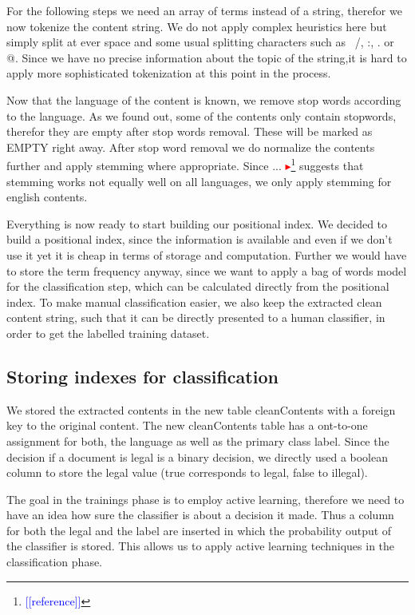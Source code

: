 \documentclass[USenglish,oneside,twocolumn]{article}
\newcommand{\nb}[1]{\textcolor{red}{$\blacktriangleright$}\footnote{\textcolor{blue}{[[#1]]}}}
\begin{document}
For the following steps we need an array of terms instead of a string, therefor we now tokenize the content string. We do not apply complex heuristics here but simply split at ever space and some usual splitting characters such as \, /, :, . or @. Since we have no precise information about the topic of the string,it is hard to apply more sophisticated tokenization at this point in the process.

Now that the language of the content is known, we remove stop words according to the language. As we found out, some of the contents only contain stopwords, therefor they are empty after stop words removal. These will be marked as EMPTY right away.
After stop word removal we do normalize the contents further and apply stemming where appropriate. Since ... \nb{reference} suggests that stemming works not equally well on all languages, we only apply stemming for english contents.

Everything is now ready to start building our positional index. We decided to build a positional index, since the information is available and even if we don't use it yet it is cheap in terms of storage and computation. Further we would have to store the term frequency anyway, since we want to apply a bag of words model for the classification step, which can be calculated directly from the positional index.
To make manual classification easier, we also keep the extracted clean content string, such that it can be directly presented to a human classifier, in order to get the labelled training dataset.

\subsection{Storing indexes for classification}
We stored the extracted contents in the new table cleanContents with a foreign key to the original content. The new cleanContents table has a ont-to-one assignment for both, the language as well as the primary class label. Since the decision if a document is legal is a binary decision, we directly used a boolean column to store the legal value (true corresponds to legal, false to illegal).

The goal in the trainings phase is to employ active learning, therefore we need to have an idea how sure the classifier is about a decision it made. Thus a column for both the legal and the label are inserted in which the probability output of the classifier is stored. This allows us to apply active learning techniques in the classification phase.
\end{document}
